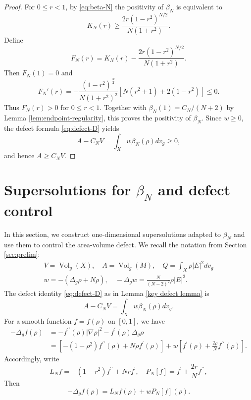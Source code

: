 \documentclass[11pt,letterpaper]{amsart}
\theoremstyle{definition}
\theoremstyle{remark}
\numberwithin{equation}{section}
\begin{document}
\begin{proof}
For $0 \leq r<1$, by \eqref{eq:beta-N} the positivity of $\beta_N$ is equivalent to
\[
 K_N(r)\ge \frac{2r(1-r^2)^{N/2}}{N(1+r^2)}.
\]
Define
$$
F_N(r)=K_N(r)-\frac{2r(1-r^2)^{N/2}}{N(1+r^2)}.
$$
Then $F_N(1)=0$ and
\[
 F_N'(r)=
 -\frac{(1-r^2)^{\frac{N}{2}}}{N(1+r^2)^2}
 \left[N(r^2+1)+2(1-r^2)\right]\le0.
\]
Thus $F_N(r)>0$ for $0\le r<1$.  Together with  
$\beta_N(1)=C_N/(N+2)$ by Lemma \ref{lem:endpoint-regularity}, this proves the positivity of $\beta_N$. Since $w \geq 0$, the defect formula \eqref{eq:defect-D} yields
\[A-C_N V=\int_X w \beta_N(\rho) d v_g \geq 0,\]
and hence $A \geq C_N V.$
\end{proof}

\section{Supersolutions for \texorpdfstring{\(\beta_N\)}{beta_N}
and defect control}\label{sec:N3}
In this section, we construct one-dimensional supersolutions adapted to  $\beta_N$ and use them to control the area-volume defect. We recall the notation from Section \ref{sec:prelim}:
\[\begin{gathered}V=\operatorname{Vol}_g(X), \quad A=\operatorname{Vol}_g(M), \quad Q=\int_X \rho|E|^2 d v_g \\ w=-(\Delta_g \rho+N \rho), \quad-\Delta_g w=\frac{N}{(N-2)^2} \rho|E|^2.\end{gathered}\]
The defect identity \eqref{eq:defect-D} as in Lemma \ref{key defect lemma}  is
\[A-C_N V=\int_X w \beta_N(\rho) d v_g.\]
 For a smooth function $f=f(\rho)$ on $[0, 1]$, we have
\begin{equation}\label{eq: Delta f rho 1}
\begin{aligned}
-\Delta_g f(\rho) & =-f^{\prime \prime}(\rho)|\nabla \rho|^2-f^{\prime}(\rho) \Delta_g \rho \\ & =\left[-\left(1-\rho^2\right) f^{\prime \prime}(\rho)+N \rho f^{\prime}(\rho)\right]+w\left[f^{\prime}(\rho)+\frac{2 \rho}{N} f^{\prime \prime}(\rho)\right].
\end{aligned}
\end{equation}
Accordingly, write
\begin{equation}\label{eq: def of LN PN 1D}
L_N f=-\left(1-r^2\right) f^{\prime \prime}+N r f^{\prime}, \quad P_N[f]=f^{\prime}+\frac{2 r}{N} f^{\prime \prime},
\end{equation}
Then
\begin{equation}\label{eq: Detla f rho main}
-\Delta_g f(\rho)=L_N f(\rho)+w P_N[f](\rho).
\end{equation}
\end{document}
